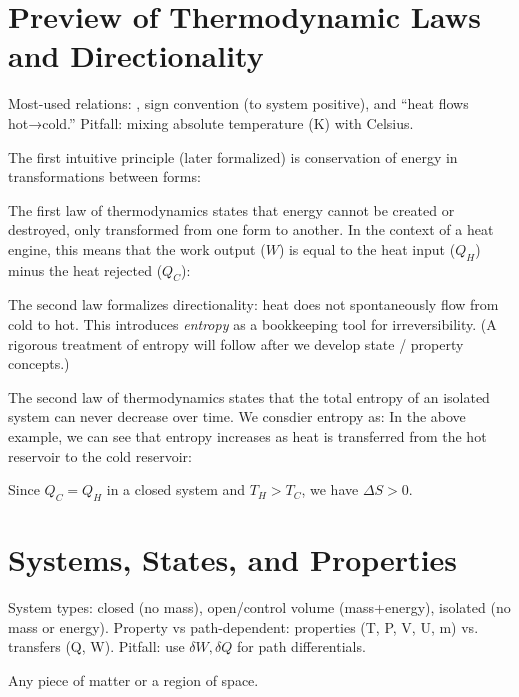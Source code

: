 \documentclass[11pt]{report}
\begin{document}
\section{Preview of Thermodynamic Laws and Directionality}
\begin{review}
Most-used relations: , sign convention (to system positive), and “heat flows hot→cold.” Pitfall: mixing absolute temperature (K) with Celsius.
\end{review}
The first intuitive principle (later formalized) is conservation of energy in transformations between forms:
\begin{definition} \label{def:firstlaw}
    The first law of thermodynamics states that energy cannot be created or destroyed, only transformed from one form to another. In the context of a heat engine, this means that the work output ($W$) is equal to the heat input ($Q_H$) minus the heat rejected ($Q_C$):
\end{definition}
The second law formalizes directionality: heat does not spontaneously flow from cold to hot. This introduces \emph{entropy} as a bookkeeping tool for irreversibility. (A rigorous treatment of entropy will follow after we develop state / property concepts.)

\begin{definition}
    The second law of thermodynamics states that the total entropy of an isolated system can never decrease over time. We consdier entropy as:
    In the above example, we can see that entropy increases as heat is transferred from the hot reservoir to the cold reservoir:


    Since $Q_C = Q_H$ in a closed system and $T_H > T_C$, we have $\Delta S > 0$.
\end{definition}



\section{Systems, States, and Properties}
\begin{review}
System types: closed (no mass), open/control volume (mass+energy), isolated (no mass or energy). Property vs path-dependent: properties (T, P, V, U, m) vs. transfers (Q, W). Pitfall: use \(\delta W, \delta Q\) for path differentials.
\end{review}
\begin{definition}[System]
    Any piece of matter or a region of space.
\end{definition}
\end{document}
